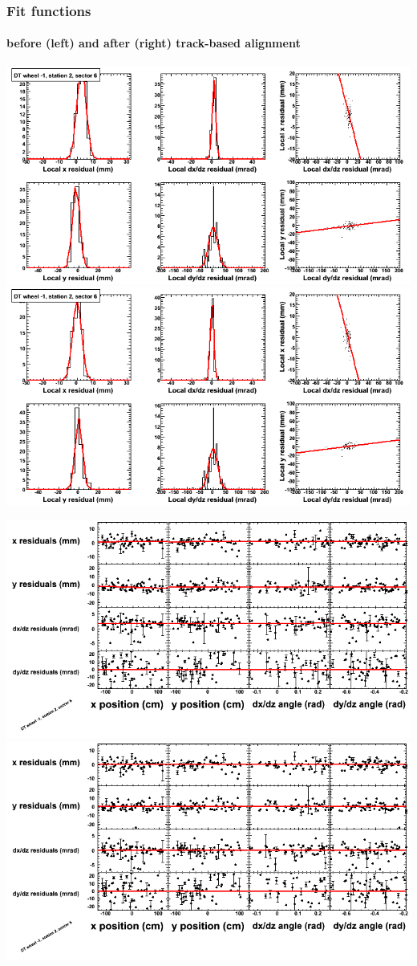 \documentclass[compress]{beamer}
\begin{document}
\begin{frame}
\frametitle{Fit functions}
\framesubtitle{before (left) and after (right) track-based alignment}
\includegraphics[width=0.5\linewidth]{fitfunctions_re01/MBwhBst2sec06_bellcurves.png} \includegraphics[width=0.5\linewidth]{fitfunctions_re05/MBwhBst2sec06_bellcurves.png}

\includegraphics[width=0.5\linewidth]{fitfunctions_re01/MBwhBst2sec06_polynomials.png} \includegraphics[width=0.5\linewidth]{fitfunctions_re05/MBwhBst2sec06_polynomials.png}
\end{frame}
\end{document}
